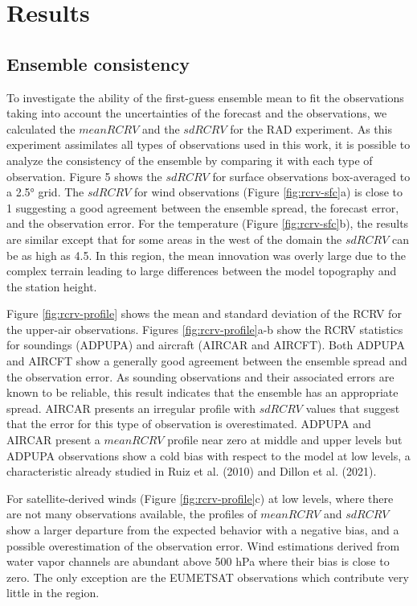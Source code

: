 \documentclass[final,5p,times,twocolumn,authoryear]{elsarticle} %
\begin{document}
\hypertarget{results}{%
\section{Results}\label{results}}

\hypertarget{ensemble-consistency}{%
\subsection{Ensemble consistency}\label{ensemble-consistency}}

To investigate the ability of the first-guess ensemble mean to fit the observations taking into account the uncertainties of the forecast and the observations, we calculated the \(mean RCRV\) and the \(sd RCRV\) for the RAD experiment. As this experiment assimilates all types of observations used in this work, it is possible to analyze the consistency of the ensemble by comparing it with each type of observation. Figure 5 shows the \(sd RCRV\) for surface observations box-averaged to a 2.5° grid. The \(sd RCRV\) for wind observations (Figure \ref{fig:rcrv-sfc}a) is close to 1 suggesting a good agreement between the ensemble spread, the forecast error, and the observation error. For the temperature (Figure \ref{fig:rcrv-sfc}b), the results are similar except that for some areas in the west of the domain the \(sd RCRV\) can be as high as 4.5. In this region, the mean innovation was overly large due to the complex terrain leading to large differences between the model topography and the station height.

Figure \ref{fig:rcrv-profile} shows the mean and standard deviation of the RCRV for the upper-air observations. Figures \ref{fig:rcrv-profile}a-b show the RCRV statistics for soundings (ADPUPA) and aircraft (AIRCAR and AIRCFT). Both ADPUPA and AIRCFT show a generally good agreement between the ensemble spread and the observation error. As sounding observations and their associated errors are known to be reliable, this result indicates that the ensemble has an appropriate spread. AIRCAR presents an irregular profile with \(sd RCRV\) values that suggest that the error for this type of observation is overestimated. ADPUPA and AIRCAR present a \(mean RCRV\) profile near zero at middle and upper levels but ADPUPA observations show a cold bias with respect to the model at low levels, a characteristic already studied in Ruiz et al. (2010) and Dillon et al. (2021).

For satellite-derived winds (Figure \ref{fig:rcrv-profile}c) at low levels, where there are not many observations available, the profiles of \(mean RCRV\) and \(sd RCRV\) show a larger departure from the expected behavior with a negative bias, and a possible overestimation of the observation error. Wind estimations derived from water vapor channels are abundant above 500 hPa where their bias is close to zero. The only exception are the EUMETSAT observations which contribute very little in the region.
\end{document}
